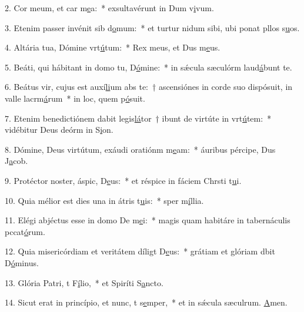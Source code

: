 2. Cor meum, et car m\uline{e}a:~* exsultavérunt in Dum v\uline{i}vum.\par 
3. Etenim passer invénit sib d\uline{o}mum:~* et turtur nidum sibi, ubi ponat pllos s\uline{u}os.\par 
4. Altária tua, Dómine vrt\uline{ú}tum:~* Rex meus, et Dus m\uline{e}us.\par 
5. Beáti, qui hábitant in domo tu, D\uline{ó}mine:~* in sǽcula sæculórm laud\uline{á}bunt te.\par 
6. Beátus vir, cujus est auxí\uline{li}um abs te:~† ascensiónes in corde suo dispósuit, in valle lacrm\uline{á}rum~* in loc, quem p\uline{ó}suit.\par 
7. Etenim benedictiónem dabit legis\uline{lá}tor~† ibunt de virtúte in vrt\uline{ú}tem:~* vidébitur Deus deórm in S\uline{i}on.\par 
8. Dómine, Deus virtútum, exáudi oratiónm m\uline{e}am:~* áuribus pércipe, Dus J\uline{a}cob.\par 
9. Protéctor noster, áspic, D\uline{e}us:~* et réspice in fáciem Chrsti t\uline{u}i.\par 
10. Quia mélior est dies una in átris t\uline{u}is:~* sper m\uline{í}llia.\par 
11. Elégi abjéctus esse in domo De m\uline{e}i:~* magis quam habitáre in tabernáculis pccat\uline{ó}rum.\par 
12. Quia misericórdiam et veritátem díligt D\uline{e}us:~* grátiam et glóriam dbit D\uline{ó}minus.\par 
13. Glória Patri, t F\uline{í}lio,~* et Spiríti S\uline{a}ncto.\par 
14. Sicut erat in princípio, et nunc, t s\uline{e}mper,~* et in sǽcula sæculrum. \uline{A}men.\par 
